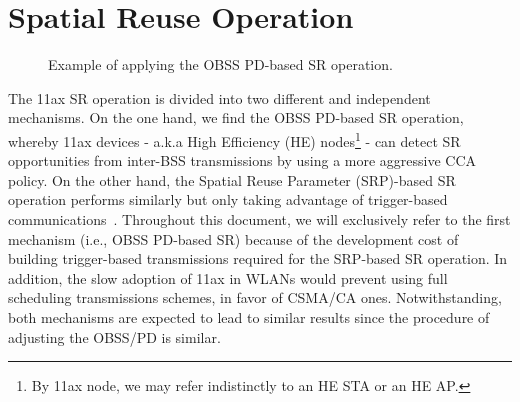 \documentclass{article}
\begin{document}
	\section{Spatial Reuse Operation}
	\label{section:sr_operation}
	
	\begin{figure}[ht!!!!]
		\centering
		\caption{Example of applying the OBSS PD-based SR operation.}
		\label{fig:scenario_example_2}
	\end{figure}
	
	The 11ax SR operation is divided into two different and independent mechanisms. On the one hand, we find the OBSS PD-based SR operation, whereby 11ax devices - a.k.a High Efficiency (HE) nodes\footnote{By 11ax node, we may refer indistinctly to an HE STA or an HE AP.} - can detect SR opportunities from inter-BSS transmissions by using a more aggressive CCA policy. On the other hand, the Spatial Reuse Parameter (SRP)-based SR operation performs similarly but only taking advantage of trigger-based communications~\cite{bellalta2019ap}. Throughout this document, we will exclusively refer to the first mechanism (i.e., OBSS PD-based SR) because of the development cost of building trigger-based transmissions required for the SRP-based SR operation. In addition, the slow adoption of 11ax in WLANs would prevent using full scheduling transmissions schemes, in favor of CSMA/CA ones. Notwithstanding, both mechanisms are expected to lead to similar results since the procedure of adjusting the OBSS/PD is similar.
	
\end{document}
